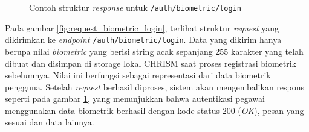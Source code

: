 \begin{figure}
    \centering
    \caption{Contoh struktur \textit{response} untuk \texttt{/auth/biometric/login}}
    \label{fig:response_biometric_login}
\end{figure}

Pada gambar \ref{fig:request_biometric_login}, terlihat struktur \textit{request} yang dikirimkan ke \textit{endpoint} \texttt{/auth/biometric/login}. Data yang dikirim hanya berupa nilai \textit{biometric} yang berisi string acak sepanjang 255 karakter yang telah dibuat dan disimpan di storage lokal CHRISM saat proses registrasi biometrik sebelumnya. Nilai ini berfungsi sebagai representasi dari data biometrik pengguna. Setelah \textit{request} berhasil diproses, sistem akan mengembalikan respons seperti pada gambar \ref{fig:response_biometric_login}, yang menunjukkan bahwa autentikasi pegawai menggunakan data biometrik berhasil dengan kode status 200 (\textit{OK}), pesan yang sesuai dan data lainnya.







